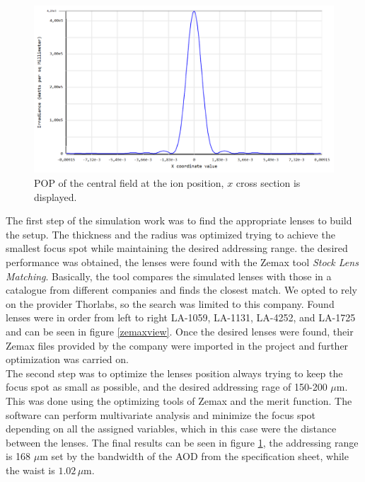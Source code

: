 \begin{figure}
    \centering
    \includegraphics[width=.8\textwidth]{img/pop2}
\caption{POP of the central field at the ion position, $x$ cross section is displayed.}
\label{zemaxfocus}
\end{figure}
The first step of the simulation work was to find the appropriate lenses to build the setup. The thickness and the radius was optimized trying to achieve the smallest focus spot while maintaining the desired addressing range. the desired performance was obtained, the lenses were found with the Zemax tool \emph{Stock Lens Matching}. Basically, the tool compares the simulated lenses with those in a catalogue from different companies and finds the closest match. We opted to rely on the provider Thorlabs, so the search was limited to this company. Found lenses were in order from left to right LA-1059, LA-1131, LA-4252, and LA-1725 and can be seen in figure \ref{zemaxview}. Once the desired lenses were found, their Zemax files provided by the company were imported in the project and further optimization was carried on.\\
The second step was to optimize the lenses position always trying to keep the focus spot as small as possible, and the desired addressing rage of 150-200 $\mu$m. This was done using the optimizing tools of Zemax and the merit function. The software can perform multivariate analysis and minimize the focus spot depending on all the assigned variables, which in this case were the distance between the lenses. The final results can be seen in figure \ref{zemaxfocus}, the addressing range is 168 $\mu$m set by the bandwidth of the AOD from the specification sheet, while the waist is $1.02\,\mu$m.\\
